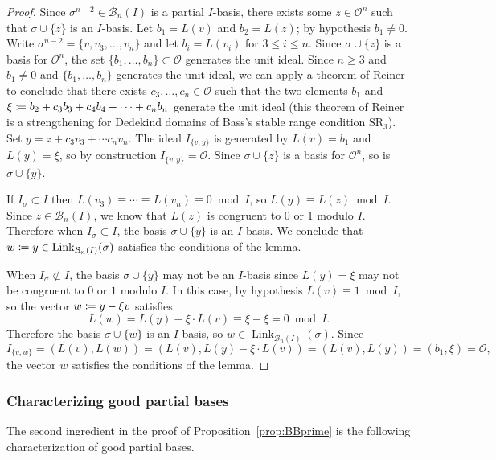 \documentclass[11 pt]{article}
\theoremstyle{plain}
\theoremstyle{definition}
\numberwithin{equation}{section}
\renewcommand{\O}{\mathcal{O}}
\newcommand\PartialBases{\ensuremath{\mathcal{B}}}
\newcommand{\PB}{\PartialBases}
\DeclareMathOperator{\Link}{Link}
\newcommand\coloneq{\mathrel{\mathop:}\mkern-1.2mu=}
\begin{document}
\begin{proof}
Since $\sigma^{n-2}\in \PartialBases_n(I)$ is a partial $I$-basis, there exists some $z \in \O^n$ such that
$\sigma \cup \{z\}$ is an $I$-basis.  Let $b_1 = L(v)$ and $b_2 = L(z)$; by hypothesis $b_1\neq 0$. Write $\sigma^{n-2} = \{v,v_3,\ldots,v_n\}$ and let $b_i = L(v_i)$ for $3 \leq i \leq n$.
Since $\sigma \cup \{z\}$ is a basis for $\O^n$, the set $\{b_1,\ldots,b_n\} \subset \O$ generates
the unit ideal.  Since $n \geq 3$ and $b_1 \neq 0$ and $\{b_1,\ldots,b_n\}$ generates the unit ideal,
we can apply a theorem of Reiner~\cite{ReinerUnimodular} to conclude that there exists $c_3,\ldots,c_n \in \O$ such that
the two elements $b_1$ and $\xi\coloneq b_2 + c_3 b_3+c_4 b_4+\cdots+c_n b_n$ generate the unit ideal (this theorem
of Reiner is a strengthening for Dedekind domains of Bass's stable range condition $\text{SR}_3$).
Set $y= z + c_3 v_3 + \cdots c_n v_n$. The ideal $I_{\{v,y\}}$ is generated by $L(v) = b_1$ and $L(y) = \xi$, so by construction $I_{\{v,y\}}=\O$. Since $\sigma \cup \{z\}$ is a basis for $\O^n$, so is $\sigma\cup \{y\}$.

If $I_\sigma \subset I$ then $L(v_3)\equiv\cdots\equiv L(v_n)\equiv 0\bmod{I}$, so $L(y)\equiv L(z)\bmod{I}$.  Since
$z\in \PartialBases_n(I)$, we know that $L(z)$ is congruent to $0$ or $1$ modulo $I$. Therefore when
$I_\sigma \subset I$, the basis $\sigma\cup\{y\}$ is an $I$-basis.  We conclude that $w \coloneq y\in \Link_{\PB_n(I)}(\sigma)$ satisfies the conditions of the lemma.

When $I_\sigma\not\subset I$, the basis $\sigma \cup \{y\}$ may not be an $I$-basis since $L(y)=\xi$ may not be congruent to $0$
or $1$ modulo $I$.  In this case, by hypothesis $L(v)\equiv 1\bmod{I}$, so the vector $w\coloneq y-\xi v$ satisfies
\[L(w)=L(y)-\xi\cdot L(v)\equiv \xi-\xi=0\bmod{I}.\]
Therefore the basis $\sigma \cup \{w\}$ is an $I$-basis, so $w\in \Link_{\PartialBases_n(I)}(\sigma)$. Since
\[I_{\{v,w\}}=(L(v),L(w))=(L(v),L(y)-\xi\cdot L(v))=(L(v),L(y))=(b_1,\xi)=\O,\]
the vector $w$ satisfies the conditions of the lemma.
\end{proof}

\subsubsection{Characterizing good partial bases}
The second ingredient in the proof of Proposition~\ref{prop:BBprime} is the following characterization of good partial bases.
\end{document}
